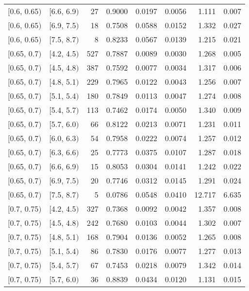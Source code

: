 \begin{longtable}{| l | l | r | r | r | r | r | r |}
        $[$0.6, 0.65$)$ & $[$6.6, 6.9$)$ & 27 & 0.9000 & 0.0197 & 0.0056 & 1.111 & 0.007 \\
        $[$0.6, 0.65$)$ & $[$6.9, 7.5$)$ & 18 & 0.7508 & 0.0588 & 0.0152 & 1.332 & 0.027 \\
        $[$0.6, 0.65$)$ & $[$7.5, 8.7$)$ & 8 & 0.8233 & 0.0567 & 0.0139 & 1.215 & 0.021 \\
        $[$0.65, 0.7$)$ & $[$4.2, 4.5$)$ & 527 & 0.7887 & 0.0089 & 0.0030 & 1.268 & 0.005 \\
        $[$0.65, 0.7$)$ & $[$4.5, 4.8$)$ & 387 & 0.7592 & 0.0077 & 0.0034 & 1.317 & 0.006 \\
        $[$0.65, 0.7$)$ & $[$4.8, 5.1$)$ & 229 & 0.7965 & 0.0122 & 0.0043 & 1.256 & 0.007 \\
        $[$0.65, 0.7$)$ & $[$5.1, 5.4$)$ & 180 & 0.7849 & 0.0113 & 0.0047 & 1.274 & 0.008 \\
        $[$0.65, 0.7$)$ & $[$5.4, 5.7$)$ & 113 & 0.7462 & 0.0174 & 0.0050 & 1.340 & 0.009 \\
        $[$0.65, 0.7$)$ & $[$5.7, 6.0$)$ & 66 & 0.8122 & 0.0213 & 0.0071 & 1.231 & 0.011 \\
        $[$0.65, 0.7$)$ & $[$6.0, 6.3$)$ & 54 & 0.7958 & 0.0222 & 0.0074 & 1.257 & 0.012 \\
        $[$0.65, 0.7$)$ & $[$6.3, 6.6$)$ & 25 & 0.7773 & 0.0375 & 0.0107 & 1.287 & 0.018 \\
        $[$0.65, 0.7$)$ & $[$6.6, 6.9$)$ & 15 & 0.8053 & 0.0304 & 0.0141 & 1.242 & 0.022 \\
        $[$0.65, 0.7$)$ & $[$6.9, 7.5$)$ & 20 & 0.7746 & 0.0312 & 0.0145 & 1.291 & 0.024 \\
        $[$0.65, 0.7$)$ & $[$7.5, 8.7$)$ & 5 & 0.0786 & 0.0548 & 0.0410 & 12.717 & 6.635 \\
        $[$0.7, 0.75$)$ & $[$4.2, 4.5$)$ & 327 & 0.7368 & 0.0092 & 0.0042 & 1.357 & 0.008 \\
        $[$0.7, 0.75$)$ & $[$4.5, 4.8$)$ & 242 & 0.7680 & 0.0103 & 0.0044 & 1.302 & 0.007 \\
        $[$0.7, 0.75$)$ & $[$4.8, 5.1$)$ & 168 & 0.7904 & 0.0136 & 0.0052 & 1.265 & 0.008 \\
        $[$0.7, 0.75$)$ & $[$5.1, 5.4$)$ & 86 & 0.7830 & 0.0176 & 0.0077 & 1.277 & 0.013 \\
        $[$0.7, 0.75$)$ & $[$5.4, 5.7$)$ & 67 & 0.7453 & 0.0218 & 0.0079 & 1.342 & 0.014 \\
        $[$0.7, 0.75$)$ & $[$5.7, 6.0$)$ & 36 & 0.8839 & 0.0434 & 0.0120 & 1.131 & 0.015 \\

\end{longtable}
